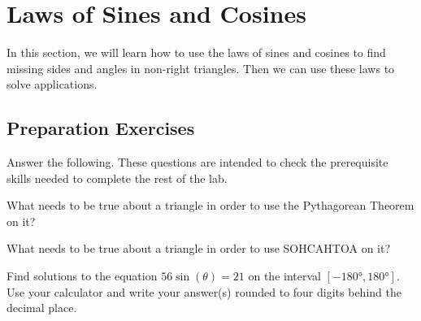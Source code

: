 
\section{Laws of Sines and Cosines} \label{section-law-of-sin-and-cos}
In this section, we will learn how to use the laws of sines and cosines to find missing sides and angles in non-right triangles. Then we can use these laws to solve applications.


\subsection*{Preparation Exercises} \label{preparation-exercises-section-law-of-sin-and-cos}

Answer the following. These questions are intended to check the prerequisite skills needed to complete the rest of the lab.

\begin{myPrep}
	What needs to be true about a triangle in order to use the Pythagorean Theorem on it?
\end{myPrep}
\vfill

\begin{myPrep}
	What needs to be true about a triangle in order to use SOHCAHTOA on it?
\end{myPrep}
\vfill

\begin{myPrep}
	Find solutions to the equation $56\sin(\theta)=21$ on the interval $[-\ang{180},\ang{180}]$. Use your calculator and write your answer(s) rounded to four digits behind the decimal place.
\end{myPrep}
\vfill
\vfill

